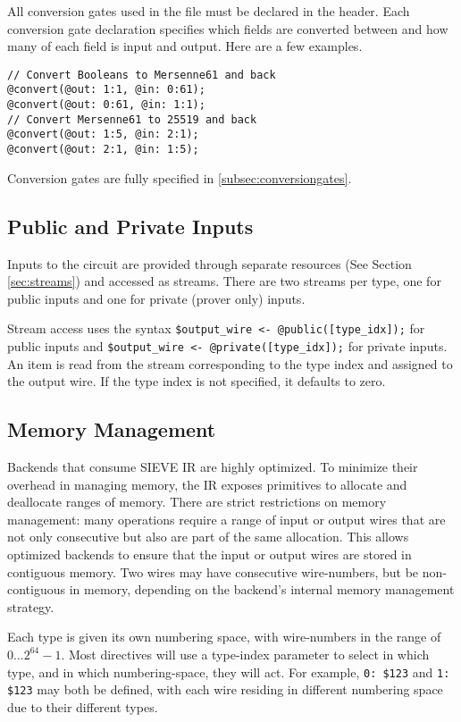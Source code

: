 All conversion gates used in the file must be declared in the header. 
Each conversion gate declaration specifies which fields are converted between and how many of each field is input and output.
Here are a few examples.
%
\begin{lstlisting}[language=ir]
// Convert Booleans to Mersenne61 and back
@convert(@out: 1:1, @in: 0:61);
@convert(@out: 0:61, @in: 1:1);
// Convert Mersenne61 to 25519 and back
@convert(@out: 1:5, @in: 2:1);
@convert(@out: 2:1, @in: 1:5);
\end{lstlisting}
Conversion gates are fully specified in \cref{subsec:conversiongates}.

\subsection{Public and Private Inputs}
Inputs to the circuit are provided through separate resources (See Section \ref{sec:streams}) and accessed as streams.
There are two streams per type, one for public inputs and one for private (prover only) inputs.

Stream access uses the syntax \texttt{\$output\_wire <- @public([type\_idx]);} for public inputs and \texttt{\$output\_wire <- @private([type\_idx]);} for private inputs.
An item is read from the stream corresponding to the type index and assigned to the output wire.
If the type index is not specified, it defaults to zero.

\subsection{Memory Management}

Backends that consume SIEVE IR are highly optimized. 
To minimize their overhead in managing memory, the IR exposes primitives to allocate and deallocate ranges of memory. 
There are strict restrictions 
on memory management: many operations require a range of input or output wires
that are not only consecutive but also are part of the same allocation.
This allows optimized backends to ensure that the input or output wires are
stored in contiguous memory.
Two wires may have consecutive wire-numbers, but be non-contiguous in memory,
depending on the backend's internal memory management strategy.

Each type is given its own numbering space, with wire-numbers in the range of $0 ... 2^{64}-1$.
Most directives will use a type-index parameter to select in which type, and in which numbering-space, they will act.
For example, \texttt{0: \$123} and \texttt{1: \$123} may both be defined, with each wire residing in different numbering space due to their different types.

